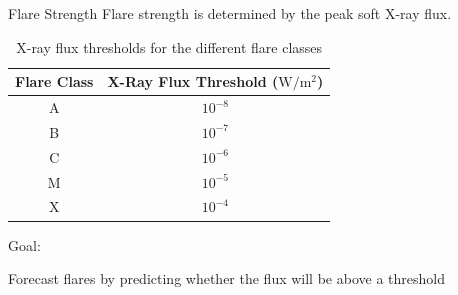 \documentclass{beamer}
\begin{document}
\begin{frame}{Flare Strength}
    Flare strength is determined by the peak soft X-ray flux.
    \begin{table}
        \centering
        \begin{tabular}{|c|c|}
            \hline
            Flare Class & X-Ray Flux Threshold ($\text{W} / \text{m}^2$) \\
            \hline
            A & $10^{-8}$ \\
            B & $10^{-7}$ \\
            C & $10^{-6}$ \\
            M & $10^{-5}$ \\
            X & $10^{-4}$ \\
            \hline
        \end{tabular}
        \caption{X-ray flux thresholds for the different flare classes}
        \label{tab:flare_classes}
    \end{table}

    Goal:
    \begin{center}
        Forecast flares by predicting whether the flux will be above a threshold
    \end{center}
\end{frame}
\end{document}
